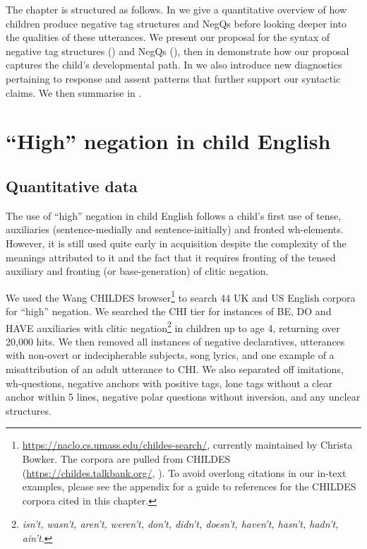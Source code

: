 \documentclass[output=paper,colorlinks,citecolor=brown]{langscibook}
\begin{document}
The chapter is structured as follows. In  we give a quantitative over\-view of how children produce negative tag structures and NegQs before looking deep\-er into the qualities of these utterances. We present our proposal for the syntax of negative tag structures () and NegQs (), then in  demonstrate how our proposal captures the child's developmental path. In  we also introduce new diagnostics pertaining to response and assent patterns that further support our syntactic claims. We then summarise in .

\section{``High'' negation in child English}\label{sect:ourdata}

\subsection{Quantitative data}\label{sect:quantdata}

The use of ``high'' negation in child English follows a child's first use of tense, auxiliaries (sentence-medially and sentence-initially) and fronted wh-elements. However, it is still used quite early in acquisition despite the complexity of the meanings attributed to it and the fact that it requires fronting of the tensed auxiliary and fronting (or base-generation) of clitic negation.

We used the Wang CHILDES browser\footnote{\url{https://naclo.cs.umass.edu/childes-search/}, currently maintained by Christa Bowker. The corpora are pulled from CHILDES (\url{https://childes.talkbank.org/}, \citealt{macwhin2000}). To avoid overlong citations in our in-text examples, please see the appendix for a guide to references for the CHILDES corpora cited in this chapter.} to search 44 UK and US English corpora for ``high'' negation. We searched the CHI tier for instances of BE, DO and HAVE auxiliaries with clitic negation\footnote{\textit{isn't, wasn't, aren't, weren't, don't, didn't, doesn't, haven't, hasn't, hadn't, ain't}.} in children up to age 4, returning over 20,000 hits. We then removed all instances of negative declaratives, utterances with non-overt or indecipherable subjects, song lyrics, and one example of a misattribution of an adult utterance to CHI. We also separated off imitations, wh-questions, negative anchors with positive tags, lone tags without a clear anchor within 5 lines, negative polar questions without inversion, and any unclear structures. 
\end{document}
